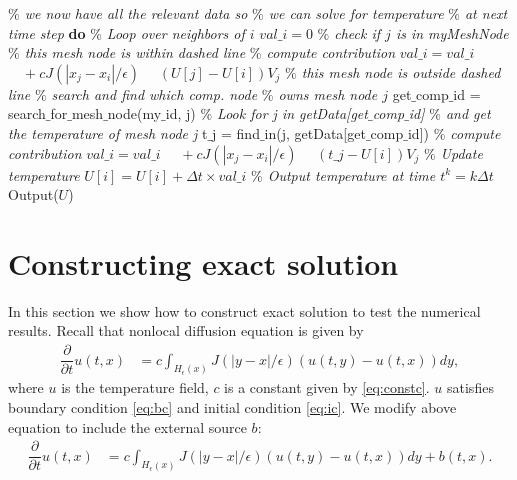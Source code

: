 \documentclass[11pt,twocolumn]{amsart}
\theoremstyle{definition}
\theoremstyle{definition}
\numberwithin{equation}{section}
\numberwithin{equation}{section}
\begin{document}
\begin{algorithm}
	\begin{algorithmic}[1]
			\STATE \textcolor{mygray}{\it $\%$ we now have all the relevant data so}
			\STATE \textcolor{mygray}{\it $\%$ we can solve for temperature}
			\STATE \textcolor{mygray}{\it $\%$ at next time step}
			 \textbf{do}
				\STATE \textcolor{mygray}{\it $\%$ Loop over neighbors of $i$}
				\STATE $val\_i = 0$
					\STATE \textcolor{mygray}{\it $\%$ check if $j$ is in myMeshNode}
						\STATE \textcolor{mygray}{\it $\%$ this mesh node is within dashed line}
						\STATE
						\STATE \textcolor{mygray}{\it $\%$ compute contribution}
						\STATE $val\_i = val\_i $
						\STATE $\quad +  c J(|x_j - x_i|/\epsilon)$
						\STATE $\quad (U[j] - U[i])V_j$
					\ELSE 
						\STATE \textcolor{mygray}{\it $\%$ this mesh node is outside dashed line}
						\STATE \textcolor{mygray}{\it $\%$ search and find which comp. node }
						\STATE \textcolor{mygray}{\it $\%$ owns mesh node $j$}
						\STATE get$\_$comp$\_$id = 
						\STATE \; search$\_$for$\_$mesh$\_$node(my$\_$id, j)
						\STATE
						\STATE \textcolor{mygray}{\it $\%$ Look for j in getData[get$\_$comp$\_$id]}
						\STATE \textcolor{mygray}{\it $\%$ and get the temperature of mesh node j}			
						\STATE t$\_$j = find$\_$in(j, getData[get$\_$comp$\_$id])
						\STATE
						\STATE \textcolor{mygray}{\it $\%$ compute contribution}
						\STATE $val\_i = val\_i $
						\STATE $\quad +  c J(|x_j - x_i|/\epsilon)$
						\STATE $\quad (t\_j - U[i])V_j$	
					\ENDIF
				\ENDFOR
				\STATE \textcolor{mygray}{\it $\%$ Update temperature}
				\STATE $U[i] = U[i] + \Delta t \times val\_i$
			\EndHloop	
			\STATE \textcolor{mygray}{\it $\%$ Output temperature at time $t^k = k\Delta t$}
			\STATE Output($U$)
		\ENDFOR
	\end{algorithmic}
\end{algorithm}

\section{Constructing exact solution}
In this section we show how to construct exact solution to test the numerical results. Recall that nonlocal diffusion equation is given by 
\begin{align*}
\dfrac{\partial }{\partial t} u(t,x) &= c \int_{H_\epsilon(x)} J(|y-x|/\epsilon) (u(t,y) - u(t,x)) dy ,
\end{align*}
where $u$ is the temperature field, $c$ is a constant given by \autoref{eq:constc}. $u$ satisfies boundary condition \autoref{eq:bc} and initial condition \autoref{eq:ic}. We modify above equation to include the external source $b$:
\begin{align}\label{eq:diff eqn 2}
\dfrac{\partial }{\partial t} u(t,x) &= c \int_{H_\epsilon(x)} J(|y-x|/\epsilon) (u(t,y) - u(t,x)) dy + b(t,x).
\end{align}
\end{document}
